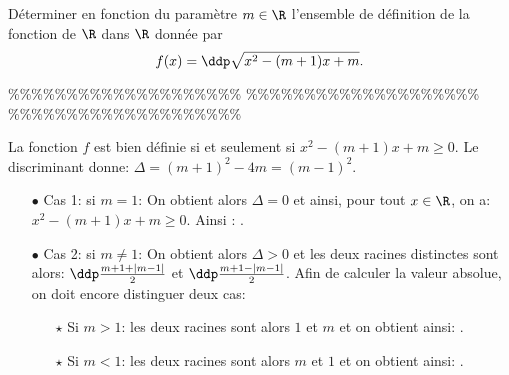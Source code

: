 



\begin{exercice}  \;
D\'eterminer en fonction du param\`etre $m\in\R$ l'ensemble de d\'efinition de la fonction de $\R$ dans $\R$ donn\'ee par
$$f(x)=\ddp\sqrt{x^2-(m+1)x+m}.$$
\end{exercice}


\%\%\%\%\%\%\%\%\%\%\%\%\%\%\%\%\%\%\%\%
\%\%\%\%\%\%\%\%\%\%\%\%\%\%\%\%\%\%\%\%
\%\%\%\%\%\%\%\%\%\%\%\%\%\%\%\%\%\%\%\%



\begin{correction}  \;
La fonction $f$ est bien d\'efinie si et seulement si $x^2-(m+1)x+m\geq 0$. Le discriminant donne: $\Delta=(m+1)^2-4m=(m-1)^2$.
\begin{itemize}
\item[$\bullet$] Cas 1: si $m=1$: On obtient alors $\Delta=0$ et ainsi, pour tout $x\in\R$, on a: $x^2-(m+1)x+m\geq 0$. Ainsi : . 
\item[$\bullet$] Cas 2: si $m\not= 1$: On obtient alors $\Delta>0$ et les deux racines distinctes sont alors: $\ddp\frac{m+1+|m-1|}{2}$ et $\ddp\frac{m+1-|m-1|}{2}$. Afin de calculer la valeur absolue, on doit encore distinguer deux cas:
\begin{itemize}
\item[$\star$] Si $m>1$: les deux racines sont alors $1$ et $m$ et on obtient ainsi: .
\item[$\star$] Si $m<1$: les deux racines sont alors $m$ et $1$ et on obtient ainsi: .
\end{itemize}
\end{itemize}
\end{correction}